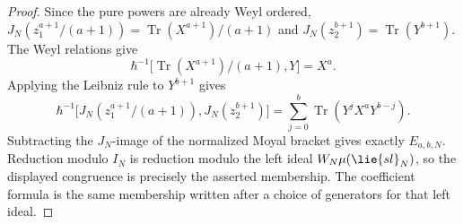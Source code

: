 \begin{proof}
  Since the pure powers are already Weyl ordered,
  \(J_N(z_1^{a+1}/(a+1))=\operatorname{Tr}(X^{a+1})/(a+1)\) and
  \(J_N(z_2^{b+1})=\operatorname{Tr}(Y^{b+1})\).  The Weyl relations give
  \[
    \hbar^{-1}
    \bigl[\operatorname{Tr}(X^{a+1})/(a+1),Y\bigr]
    =X^a .
  \]
  Applying the Leibniz rule to \(Y^{b+1}\) gives
  \[
    \hbar^{-1}
    \bigl[
      J_N(z_1^{a+1}/(a+1)),J_N(z_2^{b+1})
    \bigr]
    =
    \sum_{j=0}^b\operatorname{Tr}(Y^jX^aY^{b-j}).
  \]
  Subtracting the \(J_N\)-image of the normalized Moyal bracket gives
  exactly \(E_{a,b,N}\).  Reduction modulo \(I_N\) is reduction modulo
  the left ideal
  \(\mathcal W_N\widehat\mu(\lie{sl}_N)\), so the displayed congruence
  is precisely the asserted membership.  The coefficient formula is the
  same membership written after a choice of generators for that left
  ideal.
\end{proof}

